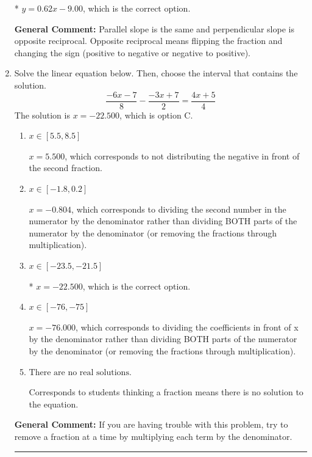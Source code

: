 \documentclass{extbook}[14pt]
\newcommand{\litem}[1]{\item #1

\rule{\textwidth}{0.4pt}}
\begin{document}
\begin{enumerate}
{\begin{enumerate}[label=\Alph*.]
* $y = 0.62x - 9.00$, which is the correct option.
\end{enumerate}

\textbf{General Comment:} Parallel slope is the same and perpendicular slope is opposite reciprocal. Opposite reciprocal means flipping the fraction and changing the sign (positive to negative or negative to positive).
}
\litem{
Solve the linear equation below. Then, choose the interval that contains the solution.
\[ \frac{-6x -7}{8} - \frac{-3x + 7}{2} = \frac{4x + 5}{4} \]The solution is \( x = -22.500 \), which is option C.\begin{enumerate}[label=\Alph*.]
\item \( x \in [5.5, 8.5] \)

 $x = 5.500$, which corresponds to not distributing the negative in front of the second fraction.
\item \( x \in [-1.8, 0.2] \)

 $x = -0.804$, which corresponds to dividing the second number in the numerator by the denominator rather than dividing BOTH parts of the numerator by the denominator (or removing the fractions through multiplication).
\item \( x \in [-23.5, -21.5] \)

* $x = -22.500$, which is the correct option.
\item \( x \in [-76, -75] \)

 $x = -76.000$, which corresponds to dividing the coefficients in front of x by the denominator rather than dividing BOTH parts of the numerator by the denominator (or removing the fractions through multiplication).
\item \( \text{There are no real solutions.} \)

Corresponds to students thinking a fraction means there is no solution to the equation.
\end{enumerate}

\textbf{General Comment:} If you are having trouble with this problem, try to remove a fraction at a time by multiplying each term by the denominator.
}
\end{enumerate}
\end{document}
